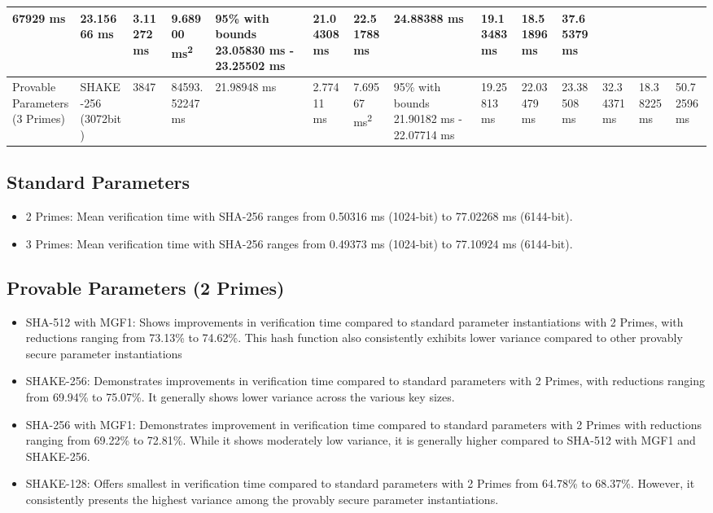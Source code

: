 \documentclass[]{final_report}
\theoremstyle{definition}
\begin{document}
\begin{landscape}
\begin{longtable}{|p{2.3cm}|p{1.8cm}|p{1.0cm}|p{1.7cm}|p{1.4cm}|p{1.5cm}|p{1.8cm}|p{1.5cm}|p{1.43cm}|p{1.5cm}|p{1.3cm}|p{1.4cm}|p{1.3cm}|p{1.37cm}|}
67929 ms & 23.15666 ms & 3.11272 ms & 9.68900 ms\textsuperscript{2} & 95\% with bounds 23.05830 ms - 23.25502 ms & 21.04308 ms & 22.51788 ms & 24.88388 ms & 19.13483 ms & 18.51896 ms & 37.65379 ms \\
\hline
Provable Parameters (3 Primes) & SHAKE-256 (3072bit) & 3847 & 84593.
52247 ms & 21.98948 ms & 2.77411 ms & 7.69567 ms\textsuperscript{2} & 95\% with bounds 21.90182 ms - 22.07714 ms & 19.25813 ms & 22.03479 ms & 23.38508 ms & 32.34371 ms & 18.38225 ms & 50.72596 ms \\
\hline


\end{longtable}

\end{landscape}




\subsection*{Standard Parameters}
\begin{itemize}
\item 2 Primes: Mean verification time with SHA-256 ranges from 0.50316 ms (1024-bit) to 77.02268 ms (6144-bit).
\item 3 Primes: Mean verification time with SHA-256 ranges from 0.49373 ms (1024-bit) to 77.10924 ms (6144-bit).
\end{itemize}

\subsection*{Provable Parameters (2 Primes)}

\begin{itemize}
\item SHA-512 with MGF1: Shows improvements in verification time compared to standard parameter instantiations with 2 Primes, with reductions ranging from 73.13\% to 74.62\%. This hash function also consistently exhibits lower variance compared to other provably secure parameter instantiations
\item SHAKE-256: Demonstrates improvements in verification time compared to standard parameters with 2 Primes, with reductions ranging from 69.94\% to 75.07\%. It generally shows lower variance across the various key sizes.
\item SHA-256 with MGF1: Demonstrates improvement in verification time compared to standard parameters with 2 Primes with reductions ranging from 69.22\% to 72.81\%. While it shows moderately low variance, it is generally higher compared to SHA-512 with MGF1 and SHAKE-256.
\item SHAKE-128: Offers smallest in verification time compared to standard parameters with 2 Primes from 64.78\% to 68.37\%. However, it consistently presents the highest variance among the provably secure parameter instantiations.
\end{itemize}
\end{document}
